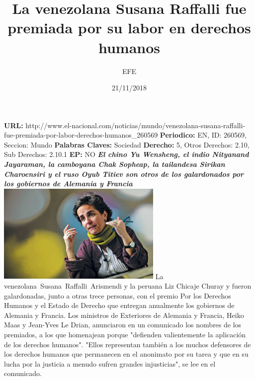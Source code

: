 \documentclass{article}%
\title{\textbf{La venezolana Susana Raffalli fue premiada por su labor en derechos humanos}}%
\author{EFE}%
\date{21/11/2018}%
\begin{document}
%
\normalsize%
\maketitle%
\textbf{URL: }%
http://www.el{-}nacional.com/noticias/mundo/venezolana{-}susana{-}raffalli{-}fue{-}premiada{-}por{-}labor{-}derechos{-}humanos\_260569\newline%
%
\textbf{Periodico: }%
EN, %
ID: %
260569, %
Seccion: %
Mundo\newline%
%
\textbf{Palabras Claves: }%
Sociedad\newline%
%
\textbf{Derecho: }%
5, %
Otros Derechos: %
2.10, %
Sub Derechos: %
2.10.1\newline%
%
\textbf{EP: }%
NO\newline%
\newline%
%
\textbf{\textit{El chino Yu Wensheng, el indio Nityanand Jayaraman, la camboyana Chak Sopheap, la tailandesa Sirikan Charoensiri y el ruso Oyub Titiev son otros de los galardonados por los gobiernos de Alemania y Francia}}%
\newline%
\newline%
%
\includegraphics[width=300px]{165.jpg}%
\newline%
%
La venezolana~Susana~Raffalli~Arismendi y la peruana Liz Chicaje Churay y fueron galardonadas, junto a otras trece personas, con el premio Por los Derechos Humanos y el Estado de Derecho que entregan anualmente los gobiernos de Alemania y Francia.%
\newline%
%
Los ministros de Exteriores de Alemania y Francia, Heiko Maas y Jean{-}Yves Le Drian, anunciaron en un comunicado los nombres de los premiados, a los que homenajean porque "defienden valientemente la aplicación de los derechos humanos".%
\newline%
%
"Ellos representan también a los muchos defensores de los derechos humanos que permanecen en el anonimato por su tarea y que en su lucha por la justicia a menudo sufren grandes injusticias", se lee en el comunicado.%
\newline%
%
\end{document}
